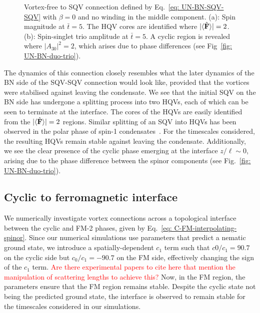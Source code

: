\begin{figure}
\begin{subfigure}{0.45\textwidth}
        \caption{}
    \end{subfigure}
    \caption[Dynamics of a singly quantised vortex to vortex-free connection in
    a uniaxial nematic to biaxial nematic interface]
    {\label{fig: UN-BN-VF-SQV} Vortex-free to SQV connection defined
    by Eq.~\eqref{eq: UN-BN-SQV-SQV} with \(\beta=0\) and no winding in the
    middle component.
    (a): Spin magnitude at \(\bar{t}=5\). The HQV cores are identified where
    \(|\langle \hat{\vb{F}} \rangle | = 2\).
    (b): Spin-singlet trio amplitude at \(\bar{t} = 5\). A cyclic region is
    revealed where \(|A_{30}|^2 = 2\), which arises due to phase differences
    (see Fig~\ref{fig: UN-BN-duo-trio}).}
\end{figure}
The dynamics of this connection closely resembles what the later dynamics of the
BN side of the SQV-SQV connection would look like, provided that the vortices
were stabilised against leaving the condensate.
We see that the initial SQV on the BN side has undergone a splitting process
into two HQVs, each of which can be seen to terminate at the interface.
The cores of the HQVs are easily identified from the
\(|\langle \hat{\vb{F}} \rangle | = 2\) regions.
Similar splitting of an SQV into HQVs has been observed in the polar phase of
spin-1 condensates~\cite{Seo2015, Xiao2021}.
For the timescales considered, the resulting HQVs remain stable against
leaving the condensate.
Additionally, we see the clear presence of the cyclic phase emerging at the
interface \(z / \ell \sim 0\), arising due to the phase difference between
the spinor components (see Fig.~\ref{fig: UN-BN-duo-trio}).

\subsection{Cyclic to ferromagnetic interface}
We numerically investigate vortex connections across a topological interface
between the cyclic and FM-2 phases, given by
Eq.~\eqref{eq: C-FM-interpolating-spinor}.
Since our numerical simulations use parameters that predict a nematic ground
state, we introduce a spatially-dependent \(c_1\) term such that \(c0/c_1=90.7\)
on the cyclic side but \(c_0/c_1=-90.7\) on the FM side, effectively changing
the sign of the \(c_1\) term.
\textcolor{red}{Are there experimental papers to cite here that mention the
manipulation of scattering lengths to achieve this?}
Now, in the FM region, the parameters ensure that the FM region remains stable.
Despite the cyclic state not being the predicted ground state, the interface
is observed to remain stable for the timescales considered in our simulations.

